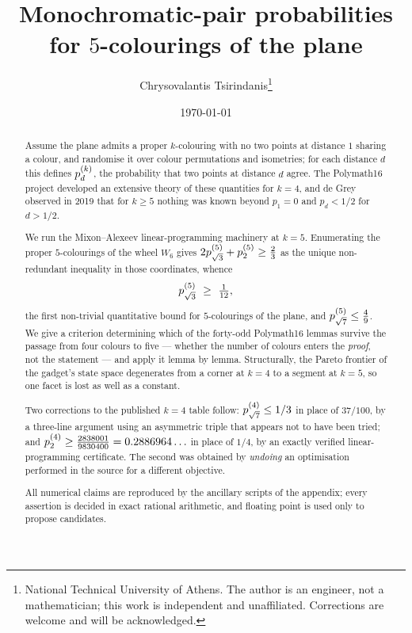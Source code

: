\documentclass[11pt,a4paper]{article}
\title{\bfseries Monochromatic-pair probabilities\\ for $5$-colourings of the plane}
\author{Chrysovalantis Tsirindanis\thanks{National Technical University of
Athens. The author is an engineer, not a mathematician; this work is
independent and unaffiliated. Corrections are welcome and will be
acknowledged.}}
\date{\today}
\begin{document}
\maketitle

\begin{abstract}
\noindent
Assume the plane admits a proper $k$-colouring with no two points at distance
$1$ sharing a colour, and randomise it over colour permutations and isometries;
for each distance $d$ this defines $p^{(k)}_{d}$, the probability that two points
at distance $d$ agree. The Polymath16 project developed an extensive theory of
these quantities for $k=4$, and de Grey observed in 2019 that for $k\ge5$
nothing was known beyond $p_1=0$ and $p_d<1/2$ for $d>1/2$.

We run the Mixon--Alexeev linear-programming machinery at $k=5$. Enumerating
the proper $5$-colourings of the wheel $W_6$ gives
$2p^{(5)}_{\sqrt3}+p^{(5)}_{2}\ge\tfrac23$ as the unique non-redundant inequality in
those coordinates, whence
\[
p^{(5)}_{\sqrt3}\ \ge\ \tfrac1{12},
\]
the first non-trivial quantitative bound for $5$-colourings of the plane, and
$p^{(5)}_{\sqrt7}\le\tfrac49$. We give a criterion determining which of the
forty-odd Polymath16 lemmas survive the passage from four colours to five ---
whether the number of colours enters the \emph{proof}, not the statement --- and
apply it lemma by lemma. Structurally, the Pareto frontier of the gadget's state
space degenerates from a corner at $k=4$ to a segment at $k=5$, so one facet is
lost as well as a constant.

Two corrections to the published $k=4$ table follow: $p^{(4)}_{\sqrt7}\le1/3$ in
place of $37/100$, by a three-line argument using an asymmetric triple that
appears not to have been tried; and
$p^{(4)}_{2}\ge\tfrac{2838001}{9830400}=0.2886964\ldots$ in place of $1/4$, by an
exactly verified linear-programming certificate. The second was obtained by
\emph{undoing} an optimisation performed in the source for a different
objective.

All numerical claims are reproduced by the ancillary scripts of the appendix;
every assertion is decided in exact rational arithmetic, and floating point is
used only to propose candidates.
\end{abstract}





\end{document}

